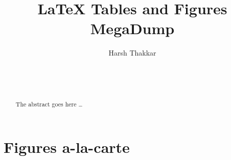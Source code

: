 \documentclass{sig-alternate-05-2015}
\begin{document}

\title{LaTeX Tables and Figures MegaDump}


%

\author{
\alignauthor
Harsh Thakkar\\
       \\
       \\
       \\
}




\maketitle
\begin{abstract}
The abstract goes here \dots
\end{abstract}


%
%



%
%

%
%
\printccsdesc



\section{Figures a-la-carte}\label{figs}
\end{document}
